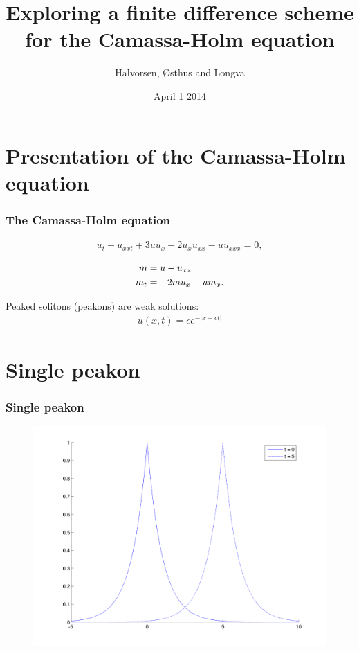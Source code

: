 \documentclass{beamer}
\title[Camassa-Holm]{Exploring a finite difference scheme \\ for the Camassa-Holm equation} %
\author{Halvorsen, \O sthus and Longva} %
\institute[NTNU] %
{
Norwegian University of Science and Technology
\medskip
}
\date{April 1 2014} %
\begin{document}
\begin{frame}
\titlepage %
\end{frame}

\section{Presentation of the Camassa-Holm equation}
\begin{frame}
\frametitle{The Camassa-Holm equation}

\begin{align*}
u_{t} - u_{xxt} + 3uu_{x} - 2u_{x}u_{xx} - uu_{xxx} = 0,
\end{align*}


\begin{align*}
m &= u - u_{xx} \notag \\
m_t &= -2mu_x - um_x.
\label{eq:CHhamiltonian}
\end{align*}

Peaked solitons (peakons) are weak solutions:
\begin{align*}
u(x, t) = ce^{-|x - ct|}
\end{align*}

\end{frame}


\section{Single peakon}
\begin{frame}
\frametitle{Single peakon}

\begin{figure}
\includegraphics[width=0.8\linewidth]{gfx/peakon}
\end{figure}

\end{frame}
\end{document}
